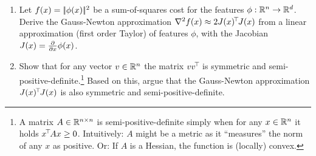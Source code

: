 

\renewcommand{\course}{Optimization Algorithms}
\renewcommand{\coursepicture}{optim}
\renewcommand{\coursedate}{Winter 2024/25}
\renewcommand{\exnum}{Weekly Exercise 3}

\exercises


\exercisestitle



\begin{enumerate}

\item Let $f(x) = |\!|\phi(x)|\!|^2$ be a sum-of-squares cost for the features $\phi:{\mathbb{R}}^n\to {\mathbb{R}}^d$. Derive the Gauss-Newton approximation ${\nabla_{\!\!}^2} f(x) \approx 2J(x)^{\!\top\!} J(x)$ from a linear approximation (first order Taylor) of features $\phi$, with the Jacobian $J(x) = \textstyle\frac{\partial}{\partial x} \phi(x)$.



        
        

\item Show that for any vector
$v\in{\mathbb{R}}^n$ the matrix $v v^{\!\top\!}$ is symmetric and
semi-positive-definite.\footnote{ A matrix $A\in{\mathbb{R}}^{n\times n}$ is
semi-positive-definite simply when for any $x\in{\mathbb{R}}^n$ it holds $x^{\!\top\!}
A x \ge 0$. Intuitively: $A$ might be a metric as it ``measures'' the
norm of any $x$ as positive. Or: If $A$ is a Hessian, the function is
(locally) convex.} Based on this, argue that the Gauss-Newton approximation
$J(x)^{\!\top\!} J(x)$ is also symmetric and
semi-positive-definite.

\end{enumerate}




